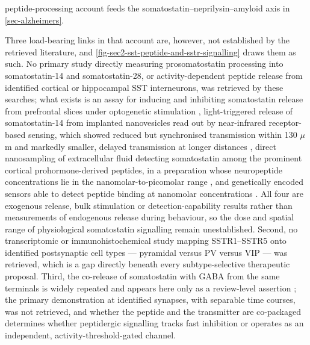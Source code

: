 \documentclass[11pt]{article}
\begin{document}
peptide-processing account feeds the somatostatin--neprilysin--amyloid axis in \ref{sec-alzheimers}.

Three load-bearing links in that account are, however, not established by the retrieved literature, and \ref{fig-sec2-sst-peptide-and-sstr-signalling} draws them as such. No primary study directly measuring prosomatostatin processing into somatostatin-14 and somatostatin-28, or activity-dependent peptide release from identified cortical or hippocampal SST interneurons, was retrieved by these searches; what exists is an assay for inducing and inhibiting somatostatin release from prefrontal slices under optogenetic stimulation \citep{Dao2019}, light-triggered release of somatostatin-14 from implanted nanovesicles read out by near-infrared receptor-based sensing, which showed reduced but synchronised transmission within 130 $\mu$m and markedly smaller, delayed transmission at longer distances \citep{Xiong2022}, direct nanosampling of extracellular fluid detecting somatostatin among the prominent cortical prohormone-derived peptides, in a preparation whose neuropeptide concentrations lie in the nanomolar-to-picomolar range \citep{Li2025}, and genetically encoded sensors able to detect peptide binding at nanomolar concentrations \citep{Wang2023b}. All four are exogenous release, bulk stimulation or detection-capability results rather than measurements of endogenous release during behaviour, so the dose and spatial range of physiological somatostatin signalling remain unestablished. Second, no transcriptomic or immunohistochemical study mapping SSTR1--SSTR5 onto identified postsynaptic cell types --- pyramidal versus PV versus VIP --- was retrieved, which is a gap directly beneath every subtype-selective therapeutic proposal. Third, the co-release of somatostatin with GABA from the same terminals is widely repeated and appears here only as a review-level assertion \citep{Gunther2018}; the primary demonstration at identified synapses, with separable time courses, was not retrieved, and whether the peptide and the transmitter are co-packaged determines whether peptidergic signalling tracks fast inhibition or operates as an independent, activity-threshold-gated channel.
\end{document}
